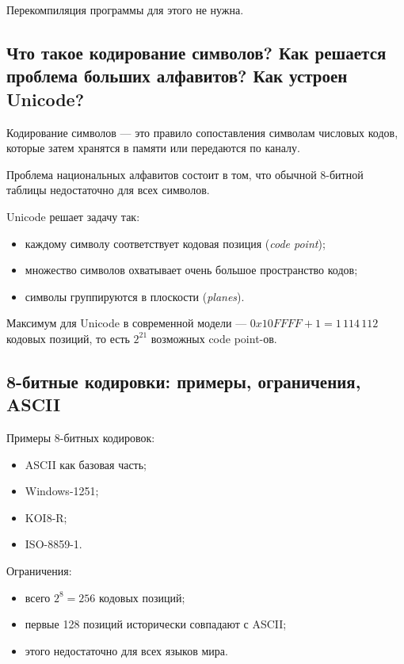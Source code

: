 Перекомпиляция программы для этого не нужна.

\subsection{Что такое кодирование символов? Как решается проблема больших алфавитов? Как устроен Unicode?}
\begin{definition}
Кодирование символов — это правило сопоставления символам числовых кодов, которые затем хранятся в памяти или передаются по каналу.
\end{definition}

Проблема национальных алфавитов состоит в том, что обычной 8-битной таблицы недостаточно для всех символов.

Unicode решает задачу так:
\begin{itemize}
    \item каждому символу соответствует кодовая позиция (\textit{code point});
    \item множество символов охватывает очень большое пространство кодов;
    \item символы группируются в плоскости (\textit{planes}).
\end{itemize}

\begin{remark}
Максимум для Unicode в современной модели — $0x10FFFF + 1 = 1\,114\,112$ кодовых позиций, то есть $2^{21}$ возможных code point-ов.
\end{remark}

\subsection{8-битные кодировки: примеры, ограничения, ASCII}
Примеры 8-битных кодировок:
\begin{itemize}
    \item ASCII как базовая часть;
    \item Windows-1251;
    \item KOI8-R;
    \item ISO-8859-1.
\end{itemize}

Ограничения:
\begin{itemize}
    \item всего $2^8 = 256$ кодовых позиций;
    \item первые 128 позиций исторически совпадают с ASCII;
    \item этого недостаточно для всех языков мира.
\end{itemize}

